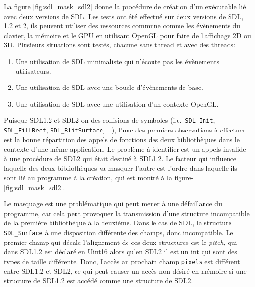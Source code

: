La figure \ref{fig:sdl_mask_sdl2} donne la procédure de création d'un
exécutable lié avec deux versions de SDL.  Les tests ont été effectué sur deux
versions de SDL, 1.2 et 2, ils peuvent utiliser des ressources commune comme
les évènements du clavier, la mémoire et le GPU en utilisant OpenGL pour faire
de l'affichage 2D ou 3D.  Plusieurs situations sont testés, chacune sans thread
et avec des threads:
%
\begin{enumerate}
    \item Une utilisation de SDL minimaliste qui n'écoute pas les évènements utilisateurs.
    \item Une utilisation de SDL avec une boucle d'évènements de base.
    \item Une utilisation de SDL avec une utilisation d'un contexte OpenGL.
\end{enumerate}

Puisque SDL1.2 et SDL2 on des collisions de symboles (i.e.\ \verb+SDL_Init+,
\verb+SDL_FillRect+, \verb+SDL_BlitSurface+, \dots), l'une des premiers
observations à effectuer est la bonne répartition des appels de fonctions des
deux bibliothèques dans le contexte d'une même application. Le problème à
identifier est un appels invalide à une procédure de SDL2 qui était destiné à
SDL1.2. Le facteur qui influence laquelle des deux bibliothèques va masquer
l'autre est l'ordre dans laquelle ils sont lié au programme à la création,
qui est montré à la figure-\ref{fig:sdl_mask_sdl2}.

Le masquage est une problématique qui peut mener à une défaillance du
programme, car cela peut provoquer la transmission d'une structure incompatible
de la première bibliothèque à la deuxième. Dans le cas de SDL, la structure
\verb+SDL_Surface+ à une disposition différente des champs, donc incompatible.
Le premier champ qui décale l'alignement de ces deux structures est le
\textit{pitch}, qui dans SDL1.2 est déclaré en Uint16 alors qu'en SDL2 il est
un int qui sont des types de taille différente. Donc, l'accès au prochain champ
\texttt{pixels} est différent entre SDL1.2 et SDL2, ce qui peut causer un accès
non désiré en mémoire si une structure de SDL1.2 est accédé comme une structure
de SDL2.


